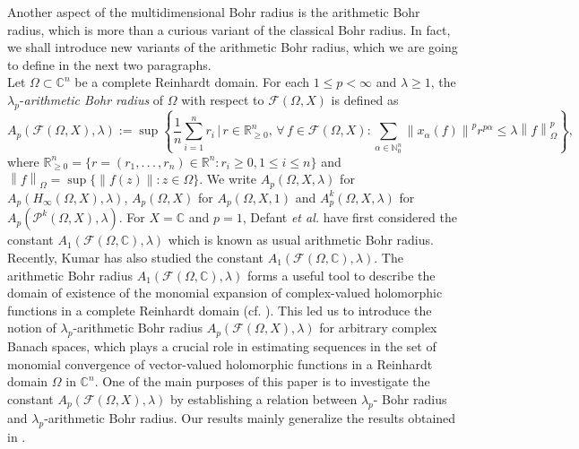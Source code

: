 \documentclass[a4paper,12pt]{amsart}
\theoremstyle{definition}
\newcounter {own}
\newcommand{\norm}[1]{\left\lVert#1\right\rVert}
\begin{document}
Another aspect of the multidimensional Bohr radius is the arithmetic Bohr radius, which is more than a curious variant of the classical Bohr radius. In fact, we shall introduce new variants of the arithmetic Bohr radius, which we are going to define in the next two paragraphs.\\

Let $\Omega \subset \mathbb{C}^n$ be a complete Reinhardt domain. For each $1\leq p<\infty$ and $\lambda\geq 1$, the $\lambda_{p}$-\textit{arithmetic Bohr radius} of $\Omega$ with respect to $\mathcal{F}(\Omega, X)$ is defined as 
\begin{equation*}
	A_{p}(\mathcal{F}(\Omega, X), \lambda) := \sup \left\{\frac{1}{n}\sum_{i=1}^{n}r_i \,|\, r\in \mathbb{R}^{n}_{\geq 0},\, \forall\, f\in \mathcal{F}(\Omega, X) : \sum_{\alpha \in \mathbb{N}^{n}_{0}}\norm{x_{\alpha}(f)}^p r^{p\alpha} \leq \lambda \norm{f}^{p}_{\Omega}\right\},
\end{equation*} 
where $\mathbb{R}^n_{\geq 0}=\{r=(r_1,.\,.\,.\,, r_n) \in \mathbb{R}^n: r_i\geq 0, 1\leq i\leq n\}$ and $\norm{f}_{\Omega}=\sup \{\|f(z)\|: z \in \Omega\}$.  We write $A_p(\Omega,X,\lambda)$ for $A_p(H_{\infty}(\Omega,X),\lambda)$, $A_p(\Omega,X)$ for $A_p(\Omega,X,1)$ and $A^k_p(\Omega,X,\lambda)$ for $A_p(\mathcal{P}^k(\Omega,X),\lambda)$. For $X=\mathbb{C}$ and $p=1$, Defant {\it et al.} \cite{defant-2007} have first considered the constant $A_1(\mathcal{F}(\Omega,\mathbb{C}),\lambda)$ which is known as usual arithmetic Bohr radius. Recently, Kumar \cite{kumar-2023} has also studied the constant $A_1(\mathcal{F}(\Omega,\mathbb{C}),\lambda)$. The arithmetic Bohr radius $A_1(\mathcal{F}(\Omega,\mathbb{C}),\lambda)$ forms a useful tool to describe the domain of existence of the monomial expansion of complex-valued holomorphic functions in a complete Reinhardt domain (cf. \cite{prengel-2005}). This led us to introduce the notion of $\lambda_{p}$-arithmetic Bohr radius $A_{p}(\mathcal{F}(\Omega, X), \lambda)$ for arbitrary complex Banach spaces, which plays a crucial role in estimating sequences in the set of monomial convergence of vector-valued holomorphic functions in a Reinhardt domain $\Omega$ in $\mathbb{C}^n$. One of the main purposes of this paper is to investigate the constant $A_{p}(\mathcal{F}(\Omega, X), \lambda)$ by establishing a relation between $\lambda_{p}$- Bohr radius and $\lambda_{p}$-arithmetic Bohr radius. Our results mainly generalize the results obtained in \cite{defant-2007}.
\end{document}
